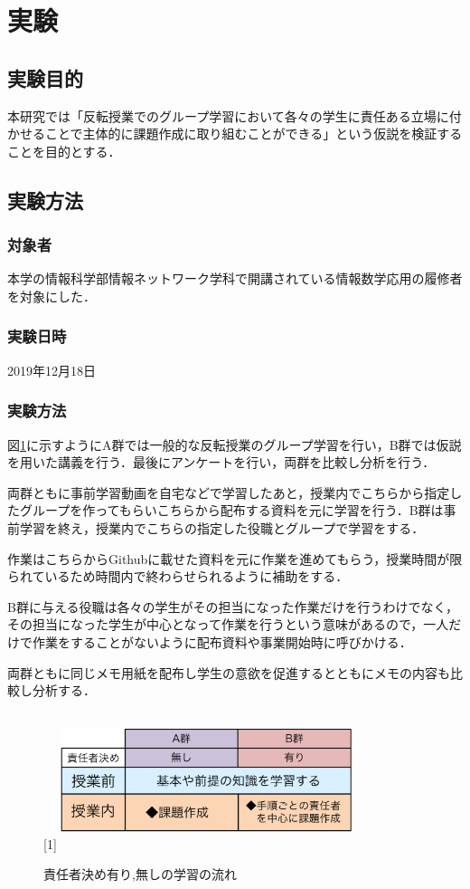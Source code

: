 \documentclass[a4j,11pt]{jsarticle}
\begin{document}
\section{実験}

\subsection{実験目的}
本研究では「反転授業でのグループ学習において各々の学生に責任ある立場に付かせることで主体的に課題作成に取り組むことができる」という仮説を検証することを目的とする．

\subsection{実験方法}
\subsubsection{対象者}
本学の情報科学部情報ネットワーク学科で開講されている情報数学応用の履修者を対象にした．
\subsubsection{実験日時}
2019年12月18日
\subsubsection{実験方法}
図\ref{nagare}に示すようにA群では一般的な反転授業のグループ学習を行い，B群では仮説を用いた講義を行う．最後にアンケートを行い，両群を比較し分析を行う．

両群ともに事前学習動画を自宅などで学習したあと，授業内でこちらから指定したグループを作ってもらいこちらから配布する資料を元に学習を行う．B群は事前学習を終え，授業内でこちらの指定した役職とグループで学習をする．

作業はこちらからGithubに載せた資料を元に作業を進めてもらう，授業時間が限られているため時間内で終わらせられるように補助をする．

B群に与える役職は各々の学生がその担当になった作業だけを行うわけでなく，その担当になった学生が中心となって作業を行うという意味があるので，一人だけで作業をすることがないように配布資料や事業開始時に呼びかける．

両群ともに同じメモ用紙を配布し学生の意欲を促進するとともにメモの内容も比較し分析する．



\begin{figure}[h]
\begin{center}
\scalebox{1}[1]{
 \includegraphics[clip,width=85mm,height=40mm]{nagare12.pdf}
 }
\end{center}
 \caption{責任者決め有り,無しの学習の流れ}
 \label{nagare}
\end{figure}
\end{document}
